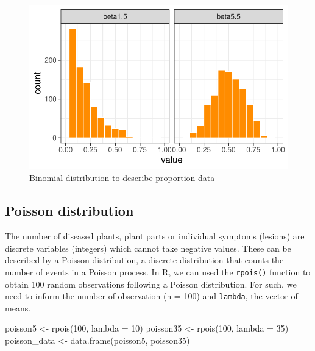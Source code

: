 \documentclass[
  letterpaper,
  DIV=11,
  numbers=noendperiod]{scrreprt}
\newenvironment{Shaded}{\begin{snugshade}}{\end{snugshade}}
\newcommand{\AttributeTok}[1]{\textcolor[rgb]{0.40,0.45,0.13}{#1}}
\newcommand{\DecValTok}[1]{\textcolor[rgb]{0.68,0.00,0.00}{#1}}
\newcommand{\FunctionTok}[1]{\textcolor[rgb]{0.28,0.35,0.67}{#1}}
\newcommand{\NormalTok}[1]{\textcolor[rgb]{0.00,0.23,0.31}{#1}}
\newcommand{\OtherTok}[1]{\textcolor[rgb]{0.00,0.23,0.31}{#1}}
\begin{document}
\begin{figure}[H]

{\centering \includegraphics{./data-type-distributions_files/figure-pdf/fig-beta-1.pdf}

}

\caption{\label{fig-beta}Binomial distribution to describe proportion
data}

\end{figure}

\hypertarget{poisson-distribution}{%
\subsection{Poisson distribution}\label{poisson-distribution}}

The number of diseased plants, plant parts or individual symptoms
(lesions) are discrete variables (integers) which cannot take negative
values. These can be described by a Poisson distribution, a discrete
distribution that counts the number of events in a Poisson process. In
R, we can used the \texttt{rpois()} function to obtain 100 random
observations following a Poisson distribution. For such, we need to
inform the number of observation (n = 100) and \texttt{lambda}, the
vector of means.

\begin{Shaded}
\begin{Highlighting}[]
\NormalTok{poisson5 }\OtherTok{\textless{}{-}} \FunctionTok{rpois}\NormalTok{(}\DecValTok{100}\NormalTok{, }\AttributeTok{lambda =} \DecValTok{10}\NormalTok{)}
\NormalTok{poisson35 }\OtherTok{\textless{}{-}} \FunctionTok{rpois}\NormalTok{(}\DecValTok{100}\NormalTok{, }\AttributeTok{lambda =} \DecValTok{35}\NormalTok{)}
\NormalTok{poisson\_data }\OtherTok{\textless{}{-}} \FunctionTok{data.frame}\NormalTok{(poisson5, poisson35)}
\end{Highlighting}
\end{Shaded}
\end{document}
